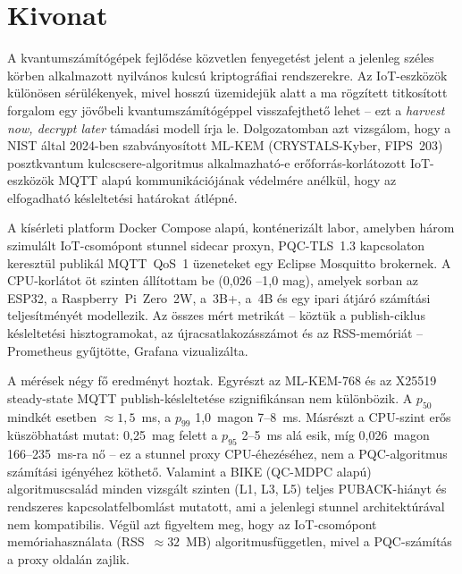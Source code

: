 \setcounter{page}{1}

\selecthungarian

\chapter*{Kivonat}

A kvantumszámítógépek fejlődése közvetlen fenyegetést jelent a jelenleg széles körben alkalmazott nyilvános kulcsú kriptográfiai rendszerekre. Az IoT-eszközök különösen sérülékenyek, mivel hosszú üzemidejük alatt a ma rögzített titkosított forgalom egy jövőbeli kvantumszámítógéppel visszafejthető lehet -- ezt a \emph{harvest now, decrypt later} támadási modell írja le. Dolgozatomban azt vizsgálom, hogy a NIST által 2024-ben szabványosított ML-KEM (CRYSTALS-Kyber, FIPS~203) posztkvantum kulcscsere-algoritmus alkalmazható-e erőforrás-korlátozott IoT-eszközök MQTT alapú kommunikációjának védelmére anélkül, hogy az elfogadható késleltetési határokat átlépné.

A kísérleti platform Docker Compose alapú, konténerizált labor, amelyben három szimulált IoT-csomópont stunnel sidecar proxyn, PQC-TLS~1.3 kapcsolaton keresztül publikál MQTT~QoS~1 üzeneteket egy Eclipse Mosquitto brokernek. A CPU-korlátot öt szinten állítottam be (0,026 --1,0 mag), amelyek sorban az ESP32, a Raspberry~Pi~Zero~2W, a~3B+, a~4B és egy ipari átjáró számítási teljesítményét modellezik. Az összes mért metrikát -- köztük a publish-ciklus késleltetési hisztogramokat, az újracsatlakozásszámot és az RSS-memóriát -- Prometheus gyűjtötte, Grafana vizualizálta.

A mérések négy fő eredményt hoztak. Egyrészt az ML-KEM-768 és az X25519 steady-state MQTT publish-késleltetése szignifikánsan nem különbözik. A $p_{50}$ mindkét esetben $\approx 1{,}5$~ms, a $p_{99}$ 1,0~magon 7--8~ms. Másrészt a CPU-szint erős küszöbhatást mutat: 0,25~mag felett a $p_{95}$ 2--5~ms alá esik, míg 0,026~magon 166--235~ms-ra nő -- ez a stunnel proxy CPU-éhezéséhez, nem a PQC-algoritmus számítási igényéhez köthető. Valamint a BIKE (QC-MDPC alapú) algoritmuscsalád minden vizsgált szinten (L1, L3, L5) teljes PUBACK-hiányt és rendszeres kapcsolatfelbomlást mutatott, ami a jelenlegi stunnel architektúrával nem kompatibilis. Végül azt figyeltem meg, hogy az IoT-csomópont memóriahasználata (RSS~$\approx 32$~MB) algoritmusfüggetlen, mivel a PQC-számítás a proxy oldalán zajlik.

